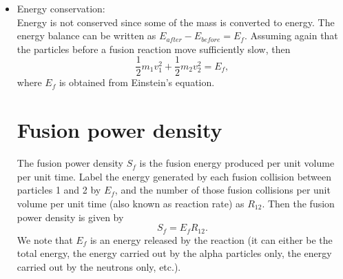\documentclass[oneside,a4paper,11pt]{report}
\begin{document}
\begin{itemize}
\item Energy conservation: \\
Energy is not conserved since some of the mass is converted to energy. The energy balance can be written as $E_{after} - E_{before} = E_f$. Assuming again that the particles before a fusion reaction move sufficiently slow, then
\begin{equation}
\frac{1}{2} m_1 v_1^2 + \frac{1}{2} m_2 v_2^2 = E_f,
\end{equation}
where $E_f$ is obtained from Einstein's equation.

\section{Fusion power density}
The fusion power density $S_f$ is the fusion energy produced per unit volume per unit time. Label the energy generated by each fusion collision between particles 1 and 2 by $E_f$, and the number of those fusion collisions per unit volume per unit time (also known as reaction rate) as $R_{12}$. Then the fusion power density is given by 
\begin{equation}
    S_f = E_f R_{12}.
\end{equation}
We note that $E_f$ is an energy released by the reaction (it can either be the total energy, the energy carried out by the alpha particles only, the energy carried out by the neutrons only, etc.). 


\end{itemize}
\end{document}
